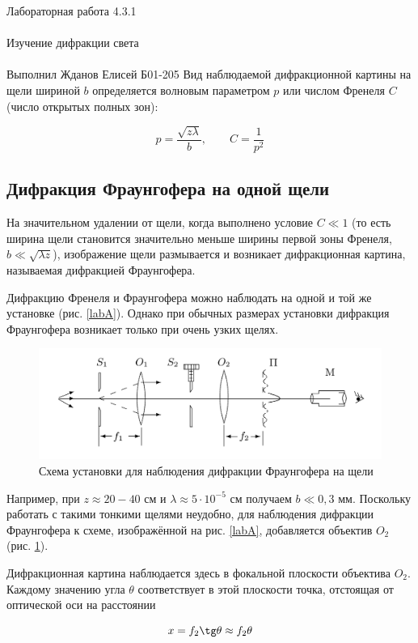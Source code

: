 \documentclass{astroedu-lab}
\begin{document}
\begin{problem}{\huge Лабораторная работа 4.3.1\\\\Изучение дифракции света\\\\Выполнил Жданов Елисей Б01-205}
Вид наблюдаемой дифракционной картины
на щели шириной $ b $ определяется волновым параметром $ p $ или числом Френеля $ C $ (число открытых полных зон):


\begin{equation}\label{}
p = \dfrac{\sqrt{z \lambda}}{b}, \qquad C = \dfrac{1}{p^2}
\end{equation}

\subsection{Дифракция Фраунгофера на одной щели}

На значительном удалении от щели, когда выполнено условие $ C \ll 1 $
(то есть ширина щели становится значительно меньше ширины первой
зоны Френеля, $ b \ll \sqrt{\lambda z} $), изображение щели размывается и возникает
дифракционная картина, называемая дифракцией Фраунгофера.

Дифракцию Френеля и Фраунгофера можно наблюдать на одной
и той же установке (рис. \ref{labA}). Однако при обычных размерах установки дифракция Фраунгофера возникает только при очень узких щелях.

\begin{figure}[H]
	\centering
	\includegraphics[scale=0.15]{4.3.1/blab.jpeg}
	\caption{Схема установки для наблюдения дифракции Фраунгофера на щели}
	\label{labB}
\end{figure}

Например, при $ z \approx  20-40 $  см и $  \lambda \approx 5 \cdot 10^{-5}  $   см получаем $  b \ll 0,3 $ мм. Поскольку работать с такими тонкими щелями неудобно, для наблюдения дифракции Фраунгофера к схеме, изображённой на рис. \ref{labA}, добавляется объектив $ O_2  $ (рис. \ref{labB}).

Дифракционная картина наблюдается здесь в фокальной плоскости
объектива $ O_2 $. Каждому значению угла $ \theta $ соответствует в этой плоскости точка, отстоящая от оптической оси на расстоянии

\begin{equation}\label{x}
x = f_2 \tg \theta \approx f_2 \theta
\end{equation}



\end{problem}
\end{document}
